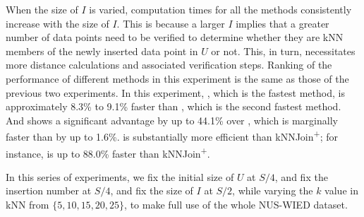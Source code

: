 When the size of $I$ is varied, computation times for all the methods consistently increase with the size of $I$. This is because a larger $I$ implies that a greater number of data points need to be verified to determine whether they are kNN members of the newly inserted data point in $U$ or not. This, in turn, necessitates more distance calculations and associated verification steps. Ranking of the performance of different methods in this experiment is the same as those of the previous two experiments. In this experiment, \cpdualtree, which is the fastest method, is approximately 8.3\% to 9.1\% faster than \spdualtree, which is the second fastest method. And \spdualtree shows a significant advantage by up to 44.1\% over \deltatree, which is marginally faster than \dualtree by up to 1.6\%. \dualtree is substantially more efficient than kNNJoin\textsuperscript{+}; for instance, \dualtree is up to 88.0\% faster than kNNJoin\textsuperscript{+}.


 In this series of experiments, we fix the initial size of $U$ at $S/4$, and fix the insertion number at $S/4$, and fix the size of $I$ at $S/2$, while varying the $k$ value in kNN from $\{5,10,15,20,25\}$, to make full use of the whole NUS-WIED dataset.

